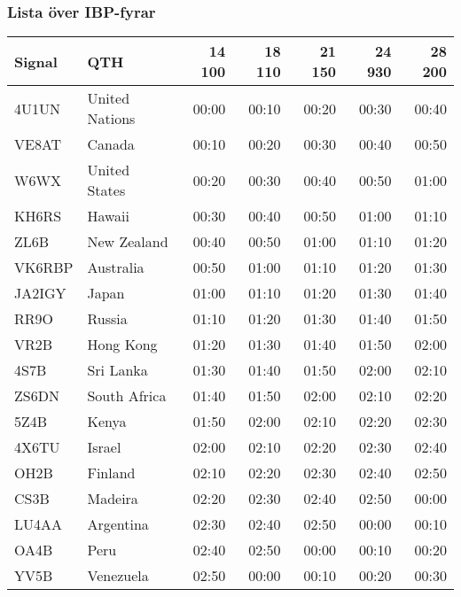 \subsubsection{Lista över IBP-fyrar}
\small
\begin{tabular}{llrrrrr}
\textbf{Signal} & \textbf{QTH} & \textbf{14 100} & \textbf{18 110} & \textbf{21 150} & \textbf{24 930} & \textbf{28 200} \\ \hline

4U1UN  & United Nations & 00:00  & 00:10  & 00:20  & 00:30  & 00:40  \\ 
VE8AT  & Canada         & 00:10  & 00:20  & 00:30  & 00:40  & 00:50  \\
W6WX   & United States  & 00:20  & 00:30  & 00:40  & 00:50  & 01:00  \\
KH6RS  & Hawaii         & 00:30  & 00:40  & 00:50  & 01:00  & 01:10  \\
ZL6B   & New Zealand    & 00:40  & 00:50  & 01:00  & 01:10  & 01:20  \\
VK6RBP & Australia      & 00:50  & 01:00  & 01:10  & 01:20  & 01:30  \\
JA2IGY & Japan          & 01:00  & 01:10  & 01:20  & 01:30  & 01:40  \\
RR9O   & Russia         & 01:10  & 01:20  & 01:30  & 01:40  & 01:50  \\
VR2B   & Hong Kong      & 01:20  & 01:30  & 01:40  & 01:50  & 02:00  \\
4S7B   & Sri Lanka      & 01:30  & 01:40  & 01:50  & 02:00  & 02:10  \\
ZS6DN  & South Africa   & 01:40  & 01:50  & 02:00  & 02:10  & 02:20  \\
5Z4B   & Kenya          & 01:50  & 02:00  & 02:10  & 02:20  & 02:30  \\
4X6TU  & Israel         & 02:00  & 02:10  & 02:20  & 02:30  & 02:40  \\
OH2B   & Finland        & 02:10  & 02:20  & 02:30  & 02:40  & 02:50  \\
CS3B   & Madeira        & 02:20  & 02:30  & 02:40  & 02:50  & 00:00  \\
LU4AA  & Argentina      & 02:30  & 02:40  & 02:50  & 00:00  & 00:10  \\
OA4B   & Peru           & 02:40  & 02:50  & 00:00  & 00:10  & 00:20  \\
YV5B   & Venezuela      & 02:50  & 00:00  & 00:10  & 00:20  & 00:30  \\
\end{tabular}

\normalsize

